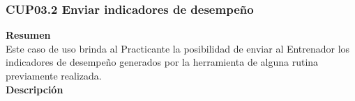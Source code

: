\subsubsection{CUP03.2 Enviar indicadores de desempeño}
\label{cu:CUP03.2}

\textbf{\textcolor[rgb]{0, 0, 0.545098}{Resumen}} \\

Este caso de uso brinda al Practicante la posibilidad de enviar al Entrenador los indicadores de desempeño generados por la herramienta de alguna rutina previamente realizada.\\

\textbf{\textcolor[rgb]{0, 0, 0.545098}{Descripción}} \\

